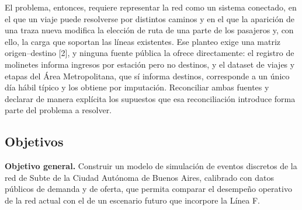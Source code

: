\documentclass{article}
\begin{document}
El problema, entonces, requiere representar la red
como un sistema conectado, en el que un viaje puede resolverse por distintos caminos y en el que la
aparición de una traza nueva modifica la elección de ruta de una parte de los pasajeros y, con ello, la
carga que soportan las líneas existentes. Ese planteo exige una matriz origen--destino [2], y ninguna fuente
pública la ofrece directamente: el registro de molinetes informa ingresos por estación pero no destinos, y
el dataset de viajes y etapas del Área Metropolitana, que sí informa destinos, corresponde a un único día
hábil típico y los obtiene por imputación. Reconciliar ambas fuentes y declarar de manera explícita los
supuestos que esa reconciliación introduce forma parte del problema a resolver.

\subsection{Objetivos}

\textbf{Objetivo general.} Construir un modelo de simulación de eventos discretos de la red de Subte de la
Ciudad Autónoma de Buenos Aires, calibrado con datos públicos de demanda y de oferta, que permita comparar
el desempeño operativo de la red actual con el de un escenario futuro que incorpore la Línea F.
\end{document}
